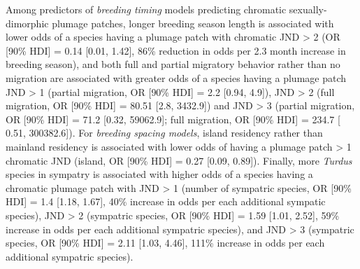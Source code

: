 \documentclass[
  a4paper,
]{article}
\begin{document}
Among predictors of \emph{breeding timing} models predicting chromatic
sexually-dimorphic plumage patches, longer breeding season length is
associated with lower odds of a species having a plumage patch with
chromatic JND \textgreater{} 2 (OR {[}90\% HDI{]} = 0.14 {[}0.01,
1.42{]}, 86\% reduction in odds per 2.3 month increase in breeding
season), and both full and partial migratory behavior rather than no
migration are associated with greater odds of a species having a plumage
patch JND \textgreater{} 1 (partial migration, OR {[}90\% HDI{]} = 2.2
{[}0.94, 4.9{]}), JND \textgreater{} 2 (full migration, OR {[}90\%
HDI{]} = 80.51 {[}2.8, 3432.9{]}) and JND \textgreater{} 3 (partial
migration, OR {[}90\% HDI{]} = 71.2 {[}0.32, 59062.9{]}; full migration,
OR {[}90\% HDI{]} = 234.7 {[} 0.51, 300382.6{]}). For \emph{breeding
spacing models}, island residency rather than mainland residency is
associated with lower odds of having a plumage patch \textgreater{} 1
chromatic JND (island, OR {[}90\% HDI{]} = 0.27 {[}0.09, 0.89{]}).
Finally, more \emph{Turdus} species in sympatry is associated with
higher odds of a species having a chromatic plumage patch with JND
\textgreater{} 1 (number of sympatric species, OR {[}90\% HDI{]} = 1.4
{[}1.18, 1.67{]}, 40\% increase in odds per each additional sympatic
species), JND \textgreater{} 2 (sympatric species, OR {[}90\% HDI{]} =
1.59 {[}1.01, 2.52{]}, 59\% increase in odds per each additional
sympatric species), and JND \textgreater{} 3 (sympatric species, OR
{[}90\% HDI{]} = 2.11 {[}1.03, 4.46{]}, 111\% increase in odds per each
additional sympatric species).
\end{document}

